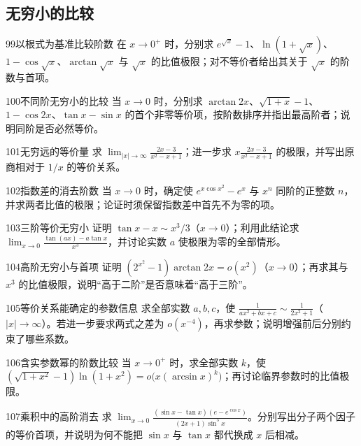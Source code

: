\subsection{无穷小的比较}
\begin{exercise}{99}{以根式为基准比较阶数}
在 $x\to0^+$ 时，分别求 $e^{\sqrt x}-1$、$\ln(1+\sqrt x)$、$1-\cos\sqrt x$、$\arctan\sqrt x$ 与 $\sqrt x$ 的比值极限；对不等价者给出其关于 $\sqrt x$ 的阶数与首项。
\end{exercise}
\begin{exercise}{100}{不同阶无穷小的比较}
当 $x\to0$ 时，分别求 $\arctan2x$、$\sqrt{1+x}-1$、$1-\cos2x$、$\tan x-\sin x$ 的首个非零等价项，按阶数排序并指出最高阶者；说明同阶是否必然等价。
\end{exercise}
\begin{exercise}{101}{无穷远的等价量}
求 $\lim_{|x|\to\infty}\frac{2x-3}{x^2-x+1}$；进一步求 $x\frac{2x-3}{x^2-x+1}$ 的极限，并写出原商相对于 $1/x$ 的等价关系。
\end{exercise}
\begin{exercise}{102}{指数差的消去阶数}
当 $x\to0$ 时，确定使 $e^{x\cos x^2}-e^x$ 与 $x^n$ 同阶的正整数 $n$，并求两者比值的极限；论证时须保留指数差中首先不为零的项。
\end{exercise}
\begin{exercise}{103}{三阶等价无穷小}
证明 $\tan x-x\sim x^3/3$（$x\to0$）；利用此结论求 $\lim_{x\to0}\frac{\tan(ax)-a\tan x}{x^3}$，并讨论实数 $a$ 使极限为零的全部情形。
\end{exercise}
\begin{exercise}{104}{高阶无穷小与首项}
证明 $(2^{x^2}-1)\arctan2x=o(x^2)$（$x\to0$）；再求其与 $x^3$ 的比值极限，说明“高于二阶”是否意味着“高于三阶”。
\end{exercise}
\begin{exercise}{105}{等价关系能确定的参数信息}
求全部实数 $a,b,c$，使 $\frac1{ax^2+bx+c}\sim\frac1{2x^2+1}$（$|x|\to\infty$）。若进一步要求两式之差为 $o(x^{-4})$，再求参数；说明增强前后分别约束了哪些系数。
\end{exercise}
\begin{exercise}{106}{含实参数幂的阶数比较}
当 $x\to0^+$ 时，求全部实数 $k$，使 $(\sqrt{1+x^2}-1)\ln(1+x^2)=o\bigl(x(\arcsin x)^k\bigr)$；再讨论临界参数时的比值极限。
\end{exercise}
\begin{exercise}{107}{乘积中的高阶消去}
求 $\lim_{x\to0}\frac{(\sin x-\tan x)(e-e^{\cos x})}{(2x+1)\sin^5x}$。分别写出分子两个因子的等价首项，并说明为何不能把 $\sin x$ 与 $\tan x$ 都代换成 $x$ 后相减。
\end{exercise}
